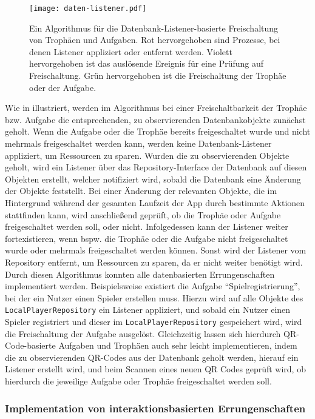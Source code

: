 \begin{figure}[H]
\texttt{[image: daten-listener.pdf]}
\caption{Ein Algorithmus für die Datenbank-Listener-basierte Freischaltung von Trophäen und Aufgaben. Rot hervorgehoben sind Prozesse, bei denen Listener appliziert oder entfernt werden. Violett hervorgehoben ist das auslösende Ereignis für eine Prüfung auf Freischaltung. Grün hervorgehoben ist die Freischaltung der Trophäe oder der Aufgabe.}\label{fig:daten-listener}
\end{figure}

\noindent Wie in  illustriert, werden im Algorithmus bei einer Freischaltbarkeit der Trophäe bzw. Aufgabe die entsprechenden, zu observierenden Datenbankobjekte zunächst geholt. Wenn die Aufgabe oder die Trophäe bereits freigeschaltet wurde und nicht mehrmals freigeschaltet werden kann, werden keine Datenbank-Listener appliziert, um Ressourcen zu sparen. Wurden die zu observierenden Objekte geholt, wird ein Listener über das Repository-Interface der Datenbank auf diesen Objekten erstellt, welcher notifiziert wird, sobald die Datenbank eine Änderung der Objekte feststellt. Bei einer Änderung der relevanten Objekte, die im Hintergrund während der gesamten Laufzeit der App durch bestimmte Aktionen stattfinden kann, wird anschließend geprüft, ob die Trophäe oder Aufgabe freigeschaltet werden soll, oder nicht. Infolgedessen kann der Listener weiter fortexistieren, wenn bspw. die Trophäe oder die Aufgabe nicht freigeschaltet wurde oder mehrmals freigeschaltet werden können. Sonst wird der Listener vom Repository entfernt, um Ressourcen zu sparen, da er nicht weiter benötigt wird. Durch diesen Algorithmus konnten alle datenbasierten Errungenschaften implementiert werden. Beispielsweise existiert die Aufgabe \enquote{Spielregistrierung}, bei der ein Nutzer einen Spieler erstellen muss. Hierzu wird auf alle Objekte des \texttt{LocalPlayerRepository} ein Listener appliziert, und sobald ein Nutzer einen Spieler registriert und dieser im \texttt{LocalPlayerRepository} gespeichert wird, wird die Freischaltung der Aufgabe ausgelöst. Gleichzeitig lassen sich hierdurch QR-Code-basierte Aufgaben und Trophäen auch sehr leicht implementieren, indem die zu observierenden QR-Codes aus der Datenbank geholt werden, hierauf ein Listener erstellt wird, und beim Scannen eines neuen QR Codes geprüft wird, ob hierdurch die jeweilige Aufgabe oder Trophäe freigeschaltet werden soll.

\subsubsection{Implementation von interaktionsbasierten Errungenschaften}

